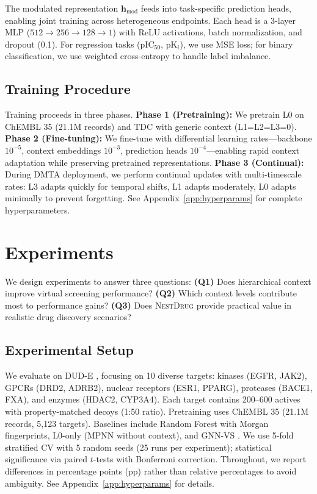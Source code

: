 \documentclass{article}
\newcommand{\methodname}{\textsc{NestDrug}}
\newcommand{\hmod}{\mathbf{h}_{\text{mod}}}
\begin{document}
The modulated representation $\hmod$ feeds into task-specific prediction heads, enabling joint training across heterogeneous endpoints. Each head is a 3-layer MLP ($512 \rightarrow 256 \rightarrow 128 \rightarrow 1$) with ReLU activations, batch normalization, and dropout (0.1). For regression tasks (pIC$_{50}$, pK$_i$), we use MSE loss; for binary classification, we use weighted cross-entropy to handle label imbalance.

\subsection{Training Procedure}

Training proceeds in three phases. \textbf{Phase 1 (Pretraining):} We pretrain L0 on ChEMBL 35 \citep{zdrazil_2024_chembl} (21.1M records) and TDC \citep{huang_2021_tdc} with generic context (L1=L2=L3=0). \textbf{Phase 2 (Fine-tuning):} We fine-tune with differential learning rates---backbone $10^{-5}$, context embeddings $10^{-3}$, prediction heads $10^{-4}$---enabling rapid context adaptation while preserving pretrained representations. \textbf{Phase 3 (Continual):} During DMTA deployment, we perform continual updates with multi-timescale rates: L3 adapts quickly for temporal shifts, L1 adapts moderately, L0 adapts minimally to prevent forgetting. See Appendix~\ref{app:hyperparams} for complete hyperparameters.

\section{Experiments}
\label{sec:experiments}

We design experiments to answer three questions: \textbf{(Q1)} Does hierarchical context improve virtual screening performance? \textbf{(Q2)} Which context levels contribute most to performance gains? \textbf{(Q3)} Does \methodname{} provide practical value in realistic drug discovery scenarios?

\subsection{Experimental Setup}

We evaluate on DUD-E \citep{mysinger_2012_dude}, focusing on 10 diverse targets: kinases (EGFR, JAK2), GPCRs (DRD2, ADRB2), nuclear receptors (ESR1, PPARG), proteases (BACE1, FXA), and enzymes (HDAC2, CYP3A4). Each target contains 200--600 actives with property-matched decoys (1:50 ratio). Pretraining uses ChEMBL 35 \citep{zdrazil_2024_chembl} (21.1M records, 5,123 targets). Baselines include Random Forest with Morgan fingerprints, L0-only (MPNN without context), and GNN-VS \citep{lim_2019_gnn_vs}. We use 5-fold stratified CV with 5 random seeds (25 runs per experiment); statistical significance via paired $t$-tests with Bonferroni correction. Throughout, we report differences in percentage points (pp) rather than relative percentages to avoid ambiguity. See Appendix~\ref{app:hyperparams} for details.
\end{document}
